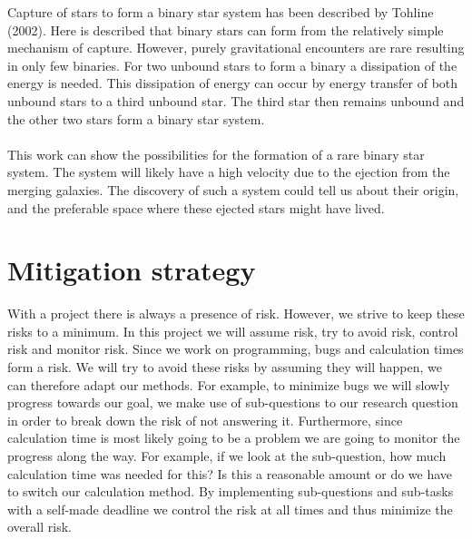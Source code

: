 \documentclass{article}
\begin{document}
Capture of stars to form a binary star system has been described by Tohline (2002)\cite{Tohline2002}. Here is described that binary stars can form from the relatively simple mechanism of capture. However, purely gravitational encounters are rare resulting in only few binaries. For two unbound stars to form a binary a dissipation of the energy is needed. This dissipation of energy can occur by energy transfer of both unbound stars to a third unbound star. The third star then remains unbound and the other two stars form a binary star system.\\
\\
This work can show the possibilities for the formation of a rare binary star system. The system will likely have a high velocity due to the ejection from the merging galaxies. The discovery of such a system could tell us about their origin, and the preferable space where these ejected stars might have lived.




\section{Mitigation strategy}%
With a project there is always a presence of risk. However, we strive to keep these risks to a minimum. In this project we will assume risk, try to avoid risk, control risk and monitor risk. Since we work on programming, bugs and calculation times form a risk. We will try to avoid these risks by assuming they will happen, we can therefore adapt our methods. For example, to minimize bugs we will slowly progress towards our goal, we make use of sub-questions to our research question in order to break down the risk of not answering it. Furthermore, since calculation time is most likely going to be a problem we are going to monitor the progress along the way. For example, if we look at the sub-question, how much calculation time was needed for this? Is this a reasonable amount or do we have to switch our calculation method. By implementing sub-questions and sub-tasks with a self-made deadline we control the risk at all times and thus minimize the overall risk.



\end{document}
